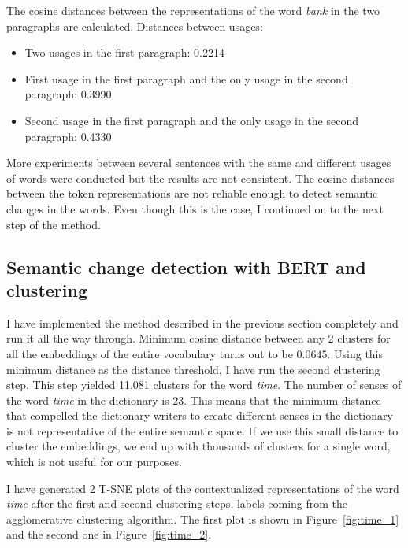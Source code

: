\documentclass[11pt]{article}
\begin{document}
The cosine distances between the representations of the word \textit{bank} in the two paragraphs are calculated.
Distances between usages:
\begin{itemize}
  \item Two usages in the first paragraph: 0.2214
  \item First usage in the first paragraph and the only usage in the second paragraph: 0.3990
  \item Second usage in the first paragraph and the only usage in the second paragraph: 0.4330
\end{itemize}

More experiments between several sentences with the same and different usages of words were conducted but the results are not consistent.
The cosine distances between the token representations are not reliable enough to detect semantic changes in the words.
Even though this is the case, I continued on to the next step of the method.

\subsection{Semantic change detection with BERT and clustering}

I have implemented the method described in the previous section completely and run it all the way through.
Minimum cosine distance between any 2 clusters for all the embeddings of the entire vocabulary turns out to be $0.0645$.
Using this minimum distance as the distance threshold, I have run the second clustering step.
This step yielded 11,081 clusters for the word \textit{time}.
The number of senses of the word \textit{time} in the dictionary is 23.
This means that the minimum distance that compelled the dictionary writers to create different senses in the dictionary is not representative of the entire semantic space.
If we use this small distance to cluster the embeddings, we end up with thousands of clusters for a single word, which is not useful for our purposes.

I have generated 2 T-SNE plots of the contextualized representations of the word \textit{time} after the first and second clustering steps, labels coming from the agglomerative clustering algorithm.
The first plot is shown in Figure~\ref{fig:time_1} and the second one in Figure~\ref{fig:time_2}.
\end{document}
